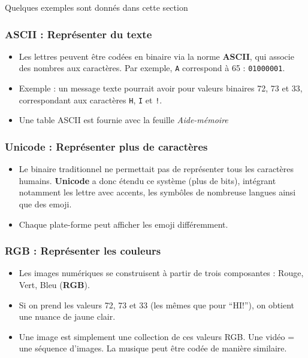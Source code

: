 Quelques exemples sont donnés dans cette section
\subsubsection{ASCII : Représenter du texte}

\begin{itemize}
	\item Les lettres peuvent être codées en binaire via la norme \textbf{ASCII}, qui associe des nombres aux caractères. Par exemple, \texttt{A} correspond à 65 : \texttt{01000001}.
	\item Exemple : un message texte pourrait avoir pour valeurs binaires 72, 73 et 33, correspondant aux caractères \texttt{H}, \texttt{I} et \texttt{!}.
	\item Une table ASCII est fournie avec la feuille \textit{Aide-mémoire}
\end{itemize}

\subsubsection{Unicode : Représenter plus de caractères}

\begin{itemize}
	\item Le binaire traditionnel ne permettait pas de représenter tous les caractères humains. \textbf{Unicode} a donc étendu ce système (plus de bits), intégrant notamment les lettre avec accents, les symbôles de nombreuse langues ainsi que des emoji.
	\item Chaque plate-forme peut afficher les emoji différemment.
\end{itemize}

\subsubsection{RGB : Représenter les couleurs}

\begin{itemize}
	\item Les images numériques se construisent à partir de trois composantes : Rouge, Vert, Bleu (\textbf{RGB}).
	\item Si on prend les valeurs 72, 73 et 33 (les mêmes que pour “HI!”), on obtient une nuance de jaune clair.
	\item Une image est simplement une collection de ces valeurs RGB. Une vidéo = une séquence d’images. La musique peut être codée de manière similaire.
\end{itemize}


